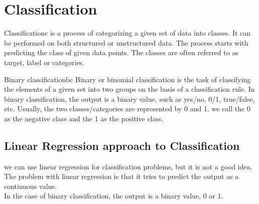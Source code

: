 \chapter{Classification}
\begin{dfnbox}{Classification}{c}
    \hspace{2em} is a process of categorizing a given set of data into classes. It can be performed on both structured or unstructured data. The process starts with predicting the class of given data points. The classes are often referred to as target, label or categories.
\end{dfnbox}

\begin{dfnbox}{Binary classification}{bc}
\hspace{2em}Binary or binomial classification is the task of classifying the elements of a given set into two groups on the basis of a classification rule. In binary classification, the output is a binary value, such as yes/no, 0/1, true/false, etc.
\tcblower
\hspace{2em}Usually, the two classes/categories are represented by 0 and 1.
we call the 0 as the negative class and the 1 as the positive class.
\end{dfnbox}

\section{Linear Regression approach to Classification}
we can use linear regression for classification problems, but it is not a good idea.\\
The problem with linear regression is that it tries to predict the output as a continuous value.\\
In the case of binary classification, the output is a binary value, 0 or 1.\\

